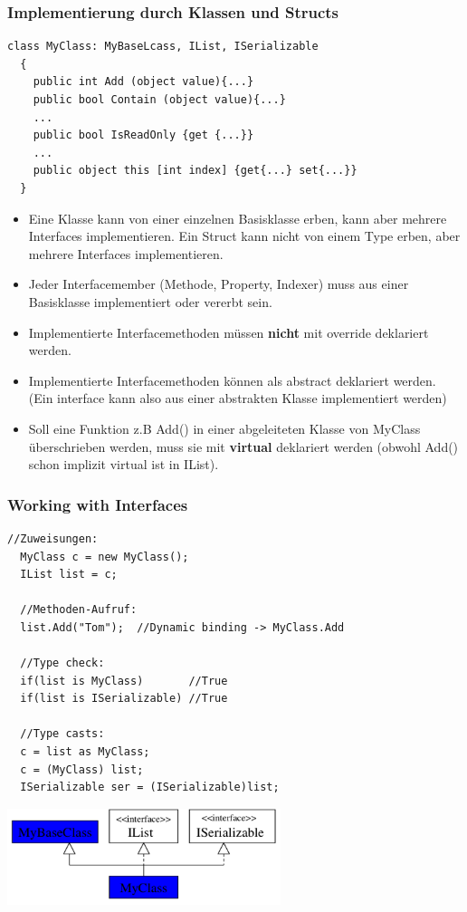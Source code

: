 \subsubsection{Implementierung durch Klassen und Structs}
\begin{lstlisting}[style=Csharp]
  class MyClass: MyBaseLcass, IList, ISerializable
  {
    public int Add (object value){...}
    public bool Contain (object value){...}
    ...
    public bool IsReadOnly {get {...}}
    ...
    public object this [int index] {get{...} set{...}}
  }
\end{lstlisting}
\begin{itemize}
	\item Eine Klasse kann von einer einzelnen Basisklasse erben, kann aber mehrere
	      Interfaces implementieren. Ein Struct kann nicht von einem Type erben, aber
	      mehrere Interfaces implementieren. 
	\item Jeder Interfacemember (Methode, Property, Indexer) muss aus einer
	      Basisklasse implementiert oder vererbt sein. 
	\item Implementierte Interfacemethoden müssen \textbf{nicht} mit override
	      deklariert werden. 
	\item Implementierte Interfacemethoden können als abstract deklariert werden.
	      (Ein interface kann also aus einer abstrakten Klasse implementiert werden)
	\item Soll eine Funktion z.B Add() in einer abgeleiteten Klasse von MyClass überschrieben werden,
	      muss sie mit \textbf{virtual} deklariert werden (obwohl Add() schon implizit virtual ist in IList).
\end{itemize}

\begin{multicols}{2}
\subsubsection{Working with Interfaces}
\begin{lstlisting}[style=Csharp]
  //Zuweisungen: 
  MyClass c = new MyClass(); 
  IList list = c; 
  
  //Methoden-Aufruf:
  list.Add("Tom");  //Dynamic binding -> MyClass.Add
  
  //Type check:
  if(list is MyClass)       //True
  if(list is ISerializable) //True
  
  //Type casts: 
  c = list as MyClass; 
  c = (MyClass) list; 
  ISerializable ser = (ISerializable)list;
\end{lstlisting}

\columnbreak

\includegraphics[width=8cm]{images/CSharp/Interface}

\end{multicols}

